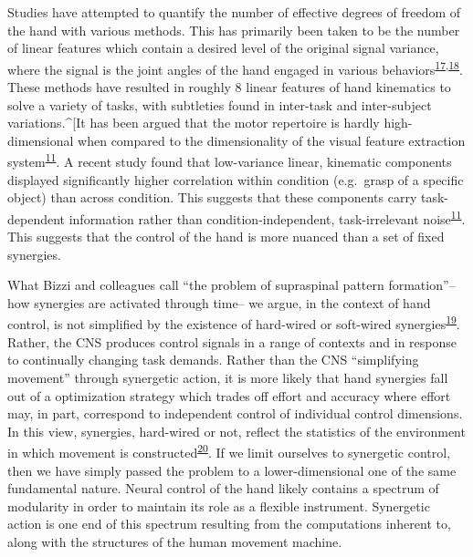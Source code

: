 \documentclass[
  a4paper,
]{article}
\begin{document}
Studies have attempted to quantify the number of effective degrees of
freedom of the hand with various methods. This has primarily been taken
to be the number of linear features which contain a desired level of the
original signal variance, where the signal is the joint angles of the
hand engaged in various
behaviors\textsuperscript{\protect\hyperlink{ref-Ingram2009}{17},\protect\hyperlink{ref-TodorovDimensionality2005}{18}}.
These methods have resulted in roughly 8 linear features of hand
kinematics to solve a variety of tasks, with subtleties found in
inter-task and inter-subject variations.\^{}{[}It has been argued that
the motor repertoire is hardly high-dimensional when compared to the
dimensionality of the visual feature extraction
system\textsuperscript{\protect\hyperlink{ref-yanUnexpectedComplexityEveryday2020}{11}}.
A recent study found that low-variance linear, kinematic components
displayed significantly higher correlation within condition (e.g.~grasp
of a specific object) than across condition. This suggests that these
components carry task-dependent information rather than
condition-independent, task-irrelevant
noise\textsuperscript{\protect\hyperlink{ref-yanUnexpectedComplexityEveryday2020}{11}}.
This suggests that the control of the hand is more nuanced than a set of
fixed synergies.

What Bizzi and colleagues call ``the problem of supraspinal pattern
formation''--how synergies are activated through time-- we argue, in the
context of hand control, is not simplified by the existence of
hard-wired or soft-wired
synergies\textsuperscript{\protect\hyperlink{ref-bizziMotorPlanningExecution2020}{19}}.
Rather, the CNS produces control signals in a range of contexts and in
response to continually changing task demands. Rather than the CNS
``simplifying movement'' through synergetic action, it is more likely
that hand synergies fall out of a optimization strategy which trades off
effort and accuracy where effort may, in part, correspond to independent
control of individual control dimensions. In this view, synergies,
hard-wired or not, reflect the statistics of the environment in which
movement is
constructed\textsuperscript{\protect\hyperlink{ref-brutonSynergiesCoordinationComprehensive2018}{20}}.
If we limit ourselves to synergetic control, then we have simply passed
the problem to a lower-dimensional one of the same fundamental nature.
Neural control of the hand likely contains a spectrum of modularity in
order to maintain its role as a flexible instrument. Synergetic action
is one end of this spectrum resulting from the computations inherent to,
along with the structures of the human movement machine.
\end{document}
